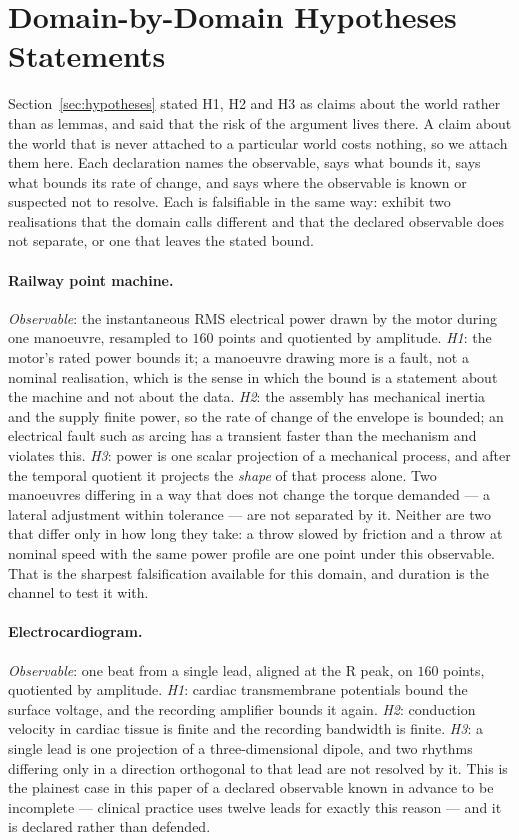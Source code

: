 \documentclass[10pt]{article}
\theoremstyle{plain}
\theoremstyle{definition}
\theoremstyle{remark}
\begin{document}
\section{Domain-by-Domain Hypotheses Statements}\label{app:hypotheses}



Section~\ref{sec:hypotheses} stated H1, H2 and H3 as claims about the world
rather than as lemmas, and said that the risk of the argument lives there. A
claim about the world that is never attached to a particular world costs
nothing, so we attach them here. Each declaration names the observable, says
what bounds it, says what bounds its rate of change, and says where the
observable is known or suspected not to resolve. Each is falsifiable in the
same way: exhibit two realisations that the domain calls different and that the
declared observable does not separate, or one that leaves the stated bound.

\paragraph{Railway point machine.}
\emph{Observable}: the instantaneous RMS electrical power drawn by the motor
during one manoeuvre, resampled to $160$ points and quotiented by amplitude.
\emph{H1}: the motor's rated power bounds it; a manoeuvre drawing more is a
fault, not a nominal realisation, which is the sense in which the bound is a
statement about the machine and not about the data. \emph{H2}: the assembly has
mechanical inertia and the supply finite power, so the rate of change of the
envelope is bounded; an electrical fault such as arcing has a transient faster
than the mechanism and violates this. \emph{H3}: power is one scalar projection
of a mechanical process, and after the temporal quotient it projects the
\emph{shape} of that process alone. Two manoeuvres differing in a way that does
not change the torque demanded --- a lateral adjustment within tolerance --- are
not separated by it. Neither are two that differ only in how long they take: a
throw slowed by friction and a throw at nominal speed with the same power
profile are one point under this observable. That is the sharpest falsification
available for this domain, and duration is the channel to test it with.

\paragraph{Electrocardiogram.}
\emph{Observable}: one beat from a single lead, aligned at the R peak, on $160$
points, quotiented by amplitude. \emph{H1}: cardiac transmembrane potentials
bound the surface voltage, and the recording amplifier bounds it again.
\emph{H2}: conduction velocity in cardiac tissue is finite and the recording
bandwidth is finite. \emph{H3}: a single lead is one projection of a
three-dimensional dipole, and two rhythms differing only in a direction
orthogonal to that lead are not resolved by it. This is the plainest case in
this paper of a declared observable known in advance to be incomplete ---
clinical practice uses twelve leads for exactly this reason --- and it is
declared rather than defended.
\end{document}
